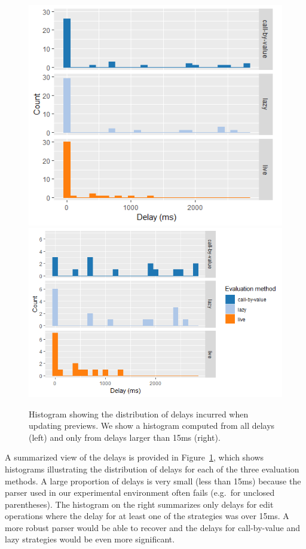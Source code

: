 \documentclass[acmsmall,anonymous,fleqn]{acmart}\settopmatter{printfolios=false,printccs=false,printacmref=false}
\theoremstyle{plain}
\theoremstyle{definition}
\begin{document}
\begin{figure}
\noindent
\includegraphics[scale=0.48]{hist-all.png}
\includegraphics[scale=0.48]{hist-slow.png}
\caption{Histogram showing the distribution of delays incurred when updating previews.
  We show a histogram computed from all delays (left) and only from delays larger
  than 15ms (right).}
\label{fig:drawing-hist}
\end{figure}


\noindent
A summarized view of the delays is provided in Figure~\ref{fig:drawing-hist}, which shows
histograms illustrating the distribution of delays for each of the three evaluation methods.
A large proportion of delays is very small (less than 15ms) because the parser used in our
experimental environment often fails (e.g.~for unclosed parentheses). The histogram
on the right summarizes only delays for edit operations where the delay for at least one of
the strategies was over 15ms. A more robust parser would be able to recover and the delays
for call-by-value and lazy strategies would be even more significant.
\end{document}
